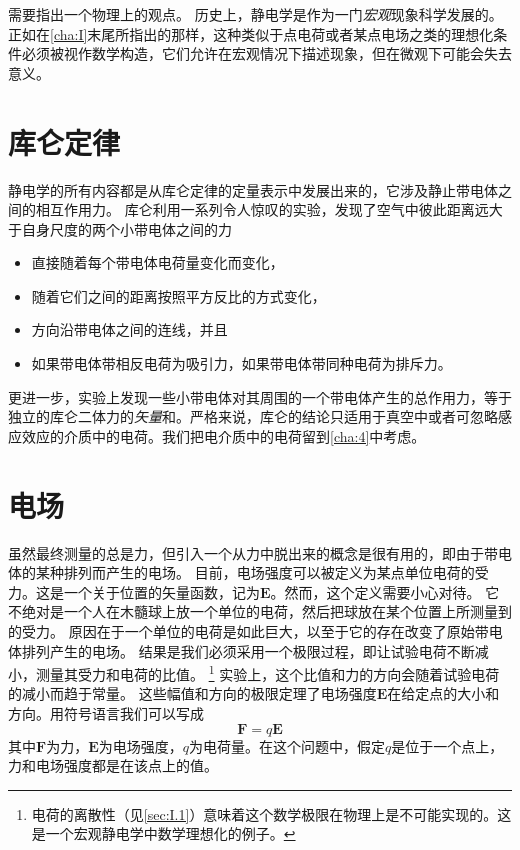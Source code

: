 \documentclass[12pt]{book}
\numberwithin{equation}{chapter}
\numberwithin{figure}{chapter}
\numberwithin{footnote}{page}
\begin{document}
需要指出一个物理上的观点。
历史上，静电学是作为一门\textit{宏观}现象科学发展的。
正如在\autoref{cha:I}末尾所指出的那样，这种类似于点电荷或者某点电场之类的理想化条件必须被视作数学构造，它们允许在宏观情况下描述现象，但在微观下可能会失去意义。

\section{库仑定律}\label{sec:1.1}

静电学的所有内容都是从库仑定律的定量表示中发展出来的，它涉及静止带电体之间的相互作用力。
库仑利用一系列令人惊叹的实验，发现了空气中彼此距离远大于自身尺度的两个小带电体之间的力
\begin{itemize}
    \item 直接随着每个带电体电荷量变化而变化，
    \item 随着它们之间的距离按照平方反比的方式变化，
    \item 方向沿带电体之间的连线，并且
    \item 如果带电体带相反电荷为吸引力，如果带电体带同种电荷为排斥力。
\end{itemize}
更进一步，实验上发现一些小带电体对其周围的一个带电体产生的总作用力，等于独立的库仑二体力的\textit{矢量}和。严格来说，库仑的结论只适用于真空中或者可忽略感应效应的介质中的电荷。我们把电介质中的电荷留到\autoref{cha:4}中考虑。

\section{电场}\label{sec:1.2}

虽然最终测量的总是力，但引入一个从力中脱出来的概念是很有用的，即由于带电体的某种排列而产生的电场。
目前，电场强度可以被定义为某点单位电荷的受力。这是一个关于位置的矢量函数，记为$\mathbf{E}$。然而，这个定义需要小心对待。
它不绝对是一个人在木髓球上放一个单位的电荷，然后把球放在某个位置上所测量到的受力。
原因在于一个单位的电荷是如此巨大，以至于它的存在改变了原始带电体排列产生的电场。
结果是我们必须采用一个极限过程，即让试验电荷不断减小，测量其受力和电荷的比值。
\footnote{电荷的离散性（见\autoref{sec:I.1}）意味着这个数学极限在物理上是不可能实现的。这是一个宏观静电学中数学理想化的例子。}
实验上，这个比值和力的方向会随着试验电荷的减小而趋于常量。
这些幅值和方向的极限定理了电场强度$\mathbf{E}$在给定点的大小和方向。用符号语言我们可以写成
\begin{equation}\label{eq:1.1}
    \mathbf{F}=q\mathbf{E}
\end{equation}
其中$\mathbf{F}$为力，$\mathbf{E}$为电场强度，$q$为电荷量。在这个问题中，假定$q$是位于一个点上，力和电场强度都是在该点上的值。
\end{document}
